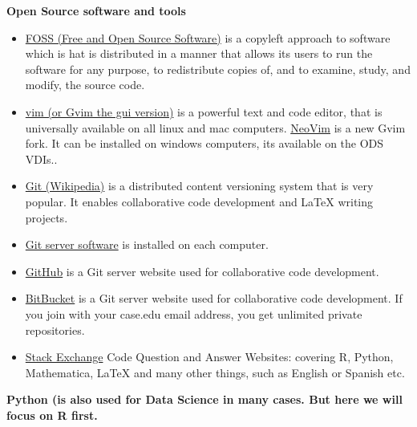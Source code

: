 \documentclass[11pt]{article} %
\begin{document}
    {\bf Open Source software and tools} \\
    
      \begin{itemize}
        \item \href{"http://en.wikipedia.org/wiki/Portal:Free_software"}{FOSS (Free and Open Source Software)} is a copyleft approach to software which is hat is distributed in a manner that allows its users to run the software for any purpose, to redistribute copies of, and to examine, study, and modify, the source code. \cite{_portal:free_2014}
        \item \href{"http://www.vim.org/"}{vim (or Gvim the gui version)} is a powerful text and code editor, that is universally available on all linux and mac computers.\cite{_gvim_2014}   \href{"http://neovim.org/"}{NeoVim} is a new Gvim fork.\cite{_neovim_2014} It can be installed on windows computers, its available on the ODS VDIs.. \cite{_gvim_2014}
        \item \href{"http://en.wikipedia.org/wiki/Git_(software)"}{Git (Wikipedia)} is a distributed content versioning system that is very popular. It enables collaborative code development and LaTeX writing projects.\cite{_git_2014-2} 
        \item \href{"http://git-scm.com/"}{Git server software} is installed on each computer.\cite{_git_2014}  
        \item  \href{"https://github.com/"}{GitHub} is a Git server website used for collaborative code development.\cite{_github_2014}
        \item  \href{"https://bitbucket.org/"}{BitBucket} is a Git server website used for collaborative code development. If you join with your case.edu email address, you get unlimited private repositories.\cite{_bitbucket:_2014} 
        \item \href{"http://stackexchange.com/tour"}{Stack Exchange}  \cite{stack_exchange_stack_2014} Code Question and Answer Websites: covering R, Python, Mathematica, {LaTeX} and many other things, such as English or Spanish etc.
      \end{itemize}
      
    {\bf Python (is also used for Data Science in many cases. But here we will focus on R first. } 
\end{document}
